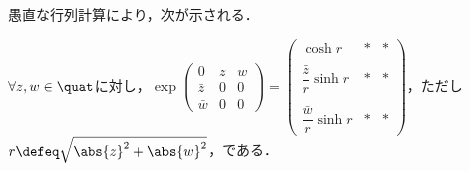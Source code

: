 愚直な行列計算により，次が示される．
\begin{lem}\label{lem:exp-quat}
  
  $\forall z,w\in \quat$に対し，$\exp
  \begin{pmatrix}
    0 & z & w  \\
    \bar{z} & 0 & 0\\
    \bar{w} & 0 & 0
  \end{pmatrix}
  =
  \begin{pmatrix}
    \cosh r &  \ast & \ast \\
    \\
    \dfrac{\bar{z}}{r} \sinh r &  \ast & \ast \\
    \\
    \dfrac{\bar{w}}{r}\sinh r &  \ast & \ast 
  \end{pmatrix}
  $，ただし$r \defeq \sqrt{\abs{z}^2 + \abs{w}^2 } $，である．
\end{lem}

